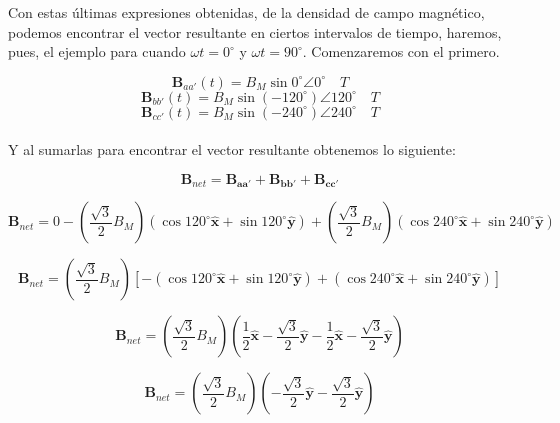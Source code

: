\documentclass[12pt,a4paper,openany]{article}
\begin{document}
	Con estas últimas expresiones obtenidas, de la densidad de campo magnético, podemos encontrar el vector resultante en ciertos intervalos de tiempo, haremos, pues, el ejemplo para cuando $\omega t= 0^{\circ}$ y $\omega t= 90^{\circ}$. Comenzaremos con el primero.

	\begin{equation*}
		\mathbf{B}_{aa'}(t)=B_{M}\sin 0^{\circ} \angle{0^{\circ}} \quad T
	\end{equation*}
	\begin{equation*}
		\mathbf{B}_{bb'}(t)=B_{M}\sin (- 120^{\circ}) \angle{120^{\circ}} \quad T
	\end{equation*}
	\begin{equation*}
		\mathbf{B}_{cc'}(t)=B_{M}\sin (- 240^{\circ}) \angle{240^{\circ}} \quad T
	\end{equation*}	
	\\
	Y al sumarlas para encontrar el vector resultante obtenemos lo siguiente:
	
	\begin{equation*}
		\mathbf{B}_{net}=\mathbf{B_{aa'}} + \mathbf{B_{bb'}} + \mathbf{B_{cc'}}
	\end{equation*}	
	
	\begin{equation*}
		\mathbf{B}_{net}=0-\left(\frac{\sqrt{3}}{2} B_{M}\right)\left(\cos120^{\circ}\mathbf{\hat{x}}+\sin120^{\circ}\mathbf{\hat{y}}\right)+\left(\frac{\sqrt{3}}{2} B_{M}\right)\left(\cos240^{\circ}\mathbf{\hat{x}}+\sin240^{\circ}\mathbf{\hat{y}}\right)
	\end{equation*}
	
	\begin{equation*}
		\mathbf{B}_{net}=\left(\frac{\sqrt{3}}{2} B_{M}\right)\left[-\left(\cos120^{\circ}\mathbf{\hat{x}}+\sin120^{\circ}\mathbf{\hat{y}}\right)+\left(\cos240^{\circ}\mathbf{\hat{x}}+\sin240^{\circ}\mathbf{\hat{y}}\right)\right]
	\end{equation*}
	
	\begin{equation*}
		\mathbf{B}_{net}=\left(\frac{\sqrt{3}}{2} B_{M}\right)\left( \frac{1}{2}\mathbf{\hat{x}}-\frac{\sqrt{3}}{2}\mathbf{\hat{y}}-\frac{1}{2}\mathbf{\hat{x}}-\frac{\sqrt{3}}{2}\mathbf{\hat{y}} \right)
	\end{equation*}
	
	\begin{equation*}
		\mathbf{B}_{net}=\left(\frac{\sqrt{3}}{2} B_{M}\right)\left( -\frac{\sqrt{3}}{2}\mathbf{\hat{y}}-\frac{\sqrt{3}}{2}\mathbf{\hat{y}} \right)
	\end{equation*}
	
\end{document}
